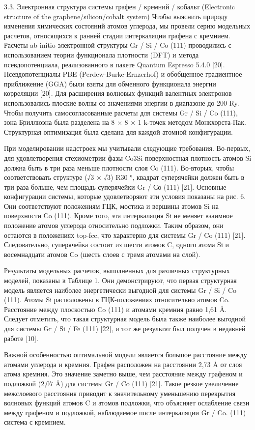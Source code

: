 3.3. Электронная структура системы графен / кремний / кобальт (Electronic structure of the graphene/silicon/cobalt system)
Чтобы выяснить природу изменения химических состояний атомов углерода, мы провели серию модельных расчетов, относящихся к ранней стадии интеркаляции графена с кремнием. Расчеты ab initio электронной структуры Gr / Si / Co (111) проводились с использованием теории функционала плотности (DFT) и метода псевдопотенциала, реализованного в пакете Quantum Espresso 5.4.0 [20]. Псевдопотенциалы PBE (Perdew-Burke-Ernzerhof) и обобщенное градиентное приближение (GGA) были взяты для обменного функционала энергии корреляции [20]. Для расширения волновых функций валентных электронов использовались плоские волны со значениями энергии в диапазоне до 200 Ry. Чтобы получить самосогласованные расчеты для системы Gr / Si / Co (111), зона Бриллюэна была разделена на 8 × 8 × 1 k-точек методом Монкхорста-Пак. Структурная оптимизация была сделана для каждой атомной конфигурации.

При моделировании надстроек мы учитывали следующие требования. Во-первых, для удовлетворения стехиометрии фазы Co3Si поверхностная плотность атомов Si должна быть в три раза меньше плотности слоя Co (111). Во-вторых, чтобы соответствовать структуре (√3 × √3) R30 °, квадрат суперячейки должен быть в три раза больше, чем площадь суперячейки Gr / Со (111) [21]. Основные конфигурации системы, которые удовлетворяют эти условия показаны на рис. 6. Они соответствуют положениям ГЦК, мостика и вершины атомов Si на поверхности Co (111). Кроме того, эта интеркаляция Si не меняет взаимное положение атомов углерода относительно подложки. Таким образом, они остаются в положениях top-fcc, что характерно для системы Gr / Co (111) [21]. Следовательно, суперячейка состоит из шести атомов C, одного атома Si и восемнадцати атомов Co (шесть слоев с тремя атомами на слой).

Результаты модельных расчетов, выполненных для различных структурных моделей, показаны в Таблице 1. Они демонстрируют, что первая структурная модель является наиболее энергетически выгодной для системы Gr / Si / Co (111). Атомы Si расположены в ГЦК-положениях относительно атомов Co. Расстояние между плоскостью Co (111) и атомами кремния равно 1,61 Å. Следует отметить, что такая структурная модель была также наиболее выгодной для системы Gr / Si / Fe (111) [22], и тот же результат был получен в недавней работе [10].

Важной особенностью оптимальной модели является большое расстояние между атомами углерода и кремния. Графен расположен на расстоянии 2,73 Å от слоя атома кремния. Это значение заметно выше, чем расстояние между графеном и подложкой (2,07 Å) для системы Gr / Co (111) [21]. Такое резкое увеличение межслоевого расстояния приводит к значительному уменьшению перекрытия волновых функций атомов C и атомов подложки, что объясняет ослабление связи между графеном и подложкой, наблюдаемое после интеркаляции Gr / Co. (111) система с кремнием.

